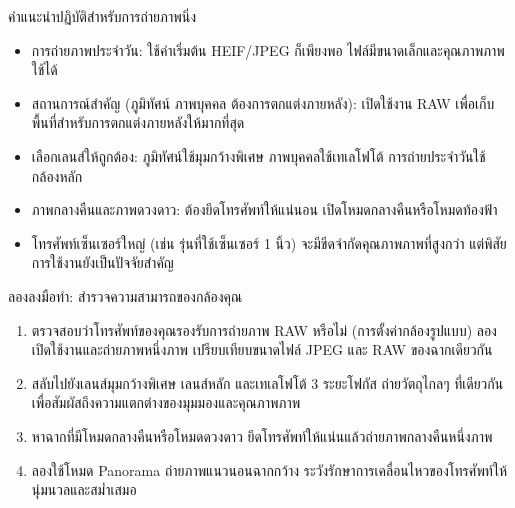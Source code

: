 \begin{tcbinfo}{คำแนะนำปฏิบัติสำหรับการถ่ายภาพนิ่ง}
\begin{itemize}
  \item การถ่ายภาพประจำวัน: ใช้ค่าเริ่มต้น HEIF/JPEG ก็เพียงพอ ไฟล์มีขนาดเล็กและคุณภาพภาพใช้ได้
  \item สถานการณ์สำคัญ (ภูมิทัศน์ ภาพบุคคล ต้องการตกแต่งภายหลัง): เปิดใช้งาน RAW เพื่อเก็บพื้นที่สำหรับการตกแต่งภายหลังให้มากที่สุด
  \item เลือกเลนส์ให้ถูกต้อง: ภูมิทัศน์ใช้มุมกว้างพิเศษ ภาพบุคคลใช้เทเลโฟโต้ การถ่ายประจำวันใช้กล้องหลัก
  \item ภาพกลางคืนและภาพดวงดาว: ต้องยึดโทรศัพท์ให้แน่นอน เปิดโหมดกลางคืนหรือโหมดท้องฟ้า
  \item โทรศัพท์เซ็นเซอร์ใหญ่ (เช่น รุ่นที่ใช้เซ็นเซอร์ 1 นิ้ว) จะมีขีดจำกัดคุณภาพภาพที่สูงกว่า แต่พิสัยการใช้งานยังเป็นปัจจัยสำคัญ
\end{itemize}

\end{tcbinfo}

\begin{tcbpractice}{ลองลงมือทำ: สำรวจความสามารถของกล้องคุณ}
\begin{enumerate}
  \item ตรวจสอบว่าโทรศัพท์ของคุณรองรับการถ่ายภาพ RAW หรือไม่ (การตั้งค่ากล้องรูปแบบ) ลองเปิดใช้งานและถ่ายภาพหนึ่งภาพ เปรียบเทียบขนาดไฟล์ JPEG และ RAW ของฉากเดียวกัน
  \item สลับไปยังเลนส์มุมกว้างพิเศษ เลนส์หลัก และเทเลโฟโต้ 3 ระยะโฟกัส ถ่ายวัตถุไกลๆ ที่เดียวกันเพื่อสัมผัสถึงความแตกต่างของมุมมองและคุณภาพภาพ
  \item หาฉากที่มีโหมดกลางคืนหรือโหมดดวงดาว ยึดโทรศัพท์ให้แน่นแล้วถ่ายภาพกลางคืนหนึ่งภาพ
  \item ลองใช้โหมด Panorama ถ่ายภาพแนวนอนฉากกว้าง ระวังรักษาการเคลื่อนไหวของโทรศัพท์ให้นุ่มนวลและสม่ำเสมอ
\end{enumerate}

\end{tcbpractice}
